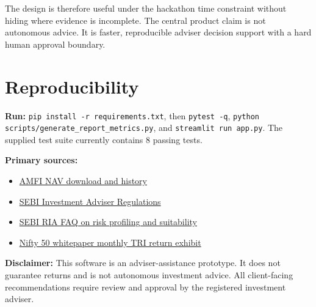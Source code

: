 \documentclass[9pt,a4paper]{article}
\newcommand{\code}[1]{\texttt{#1}}
\begin{document}
The design is therefore useful under the hackathon time constraint without hiding where evidence is incomplete. The central product claim is not autonomous advice. It is faster, reproducible adviser decision support with a hard human approval boundary.

\section*{Reproducibility}
\textbf{Run:} \code{pip install -r requirements.txt}, then \code{pytest -q}, \code{python scripts/generate\_report\_metrics.py}, and \code{streamlit run app.py}. The supplied test suite currently contains 8 passing tests.

\textbf{Primary sources:}
\begin{itemize}
\item \href{https://www.amfiindia.com/net-asset-value/nav-download}{AMFI NAV download and history}
\item \href{https://www.sebi.gov.in/legal/regulations/nov-2025/securities-and-exchange-board-of-india-investment-advisers-regulations-2013-and-securities-last-amended-on-november-25-2025-_98246.html}{SEBI Investment Adviser Regulations}
\item \href{https://www.sebi.gov.in/sebi_data/faqfiles/aug-2025/1755174193178.pdf}{SEBI RIA FAQ on risk profiling and suitability}
\item \href{https://www.niftyindices.com/docs/default-source/indices/nifty-50/nifty-50-whitepaper_2025.pdf}{Nifty 50 whitepaper monthly TRI return exhibit}
\end{itemize}

\vfill
\begin{center}\small
\textbf{Disclaimer:} This software is an adviser-assistance prototype. It does not guarantee returns and is not autonomous investment advice. All client-facing recommendations require review and approval by the registered investment adviser.
\end{center}
\end{document}
